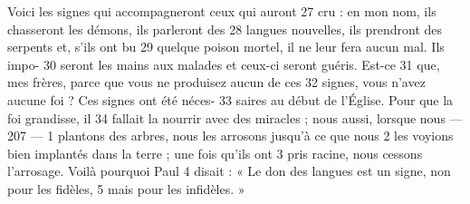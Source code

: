 Voici les signes qui accompagneront ceux qui auront	 
27	 	cru : en mon nom, ils chasseront les démons, ils parleront des	 
28	 	langues nouvelles, ils prendront des serpents et, s'ils ont bu	 
29	 	quelque poison mortel, il ne leur fera aucun mal. Ils impo-	 
30	 	seront les mains aux malades et ceux-ci seront guéris. Est-ce	 
31	 	que, mes frères, parce que vous ne produisez aucun de ces	 
32	 	signes, vous n'avez aucune foi ? Ces signes ont été néces-	 
33	 	saires au début de l'Église. Pour que la foi grandisse, il	 
34	 	fallait la nourrir avec des miracles ; nous aussi, lorsque nous	 
 	--- 207 ---	 
1	 	plantons des arbres, nous les arrosons jusqu'à ce que nous	 
2	 	les voyions bien implantés dans la terre ; une fois qu'ils ont	 
3	 	pris racine, nous cessons l'arrosage. Voilà pourquoi Paul	 
4	 	disait : « Le don des langues est un signe, non pour les fidèles,	 
5	 	mais pour les infidèles. »